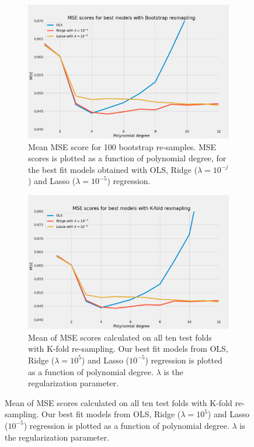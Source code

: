 \begin{figure}
     \centering
     \begin{subfigure}[t]{0.49\textwidth}
         \centering
         \includegraphics[width=\textwidth]{Figures/franke_ols_ridge_lasso_boots.png}
         \caption{Mean MSE score for 100 bootstrap re-samples. MSE scores is
             plotted as a function of polynomial degree, for the best fit
             models obtained with OLS, Ridge ($\lambda =
             10^{-j}$) and Lasso ($\lambda = 10^{-5}$) regression.}  
         \label{} 
     \end{subfigure}
     \hfill
     \begin{subfigure}[t]{0.49\textwidth}
         \centering
         \includegraphics[width=\textwidth]{Figures/franke_ols_ridge_lasso_kfold.png}
         \caption{Mean of MSE scores calculated on all ten test folds with K-fold
             re-sampling. Our best fit models from OLS, Ridge ($\lambda =
             10^{5}$) and Lasso ($10^{-5}$) regression
     is plotted as a function of polynomial degree. $\lambda $ is the 
 regularization parameter.}  
         \label{fig}
     \end{subfigure}

\end{figure}


